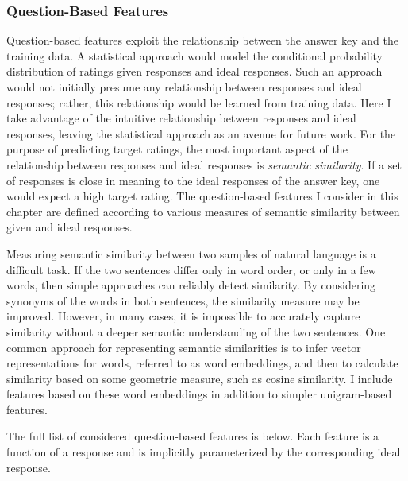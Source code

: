 \subsubsection{Question-Based Features}
Question-based features exploit the relationship between the answer key and the training data. A statistical approach would model the conditional probability distribution of ratings given responses and ideal responses. Such an approach would not initially presume any relationship between responses and ideal responses; rather, this relationship would be learned from training data. Here I take advantage of the intuitive relationship between responses and ideal responses, leaving the statistical approach as an avenue for future work. For the purpose of predicting target ratings, the most important aspect of the relationship between responses and ideal responses is \textit{semantic similarity}. If a set of responses is close in meaning to the ideal responses of the answer key, one would expect a high target rating. The question-based features I consider in this chapter are defined according to various measures of semantic similarity between given and ideal responses. 

Measuring semantic similarity between two samples of natural language is a difficult task. If the two sentences differ only in word order, or only in a few words, then simple approaches can reliably detect similarity. By considering synonyms of the words in both sentences, the similarity measure may be improved. However, in many cases, it is impossible to accurately capture similarity without a deeper semantic understanding of the two sentences. One common approach for representing semantic similarities is to infer vector representations for words, referred to as word embeddings, and then to calculate similarity based on some geometric measure, such as cosine similarity. I include features based on these word embeddings in addition to simpler unigram-based features. 

The full list of considered question-based features is below. Each feature is a function of a response and is implicitly parameterized by the corresponding ideal response.

